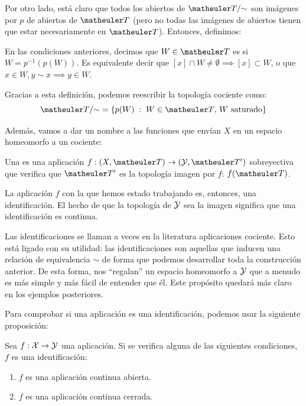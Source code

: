 Por otro lado, está claro que todos los abiertos de $\T/\mathord{\sim}$ son imágenes por $p$ de abiertos de $\T$ (pero no todas las imágenes de abiertos tienen que estar necesariamente en $\T$). Entonces, definimos:

\begin{defi}
	En las condiciones anteriores, decimos que $W\in\T$ es  si $W=p^{-1}(p(W))$. Es equivalente decir que $[x]\cap W\neq\emptyset\implies [x]\subset W$, o que $x\in W,y\sim x\implies y\in W$.
\end{defi}

Gracias a esta definición, podemos reescribir la topología cociente como:
\[\T/\mathord{\sim} = \{p(W)\midc W\in\T\text{, } W\text{ saturado}\}\]

Además, vamos a dar un nombre a las funciones que envían $X$ en un espacio homeomorfo a un cociente:

\begin{defi}[Identificación]
	Una  es una aplicación $f:(X,\T)\to (\mc{Y},\T')$ sobreyectiva que verifica que $\T'$ es la topología imagen por $f$: $f(\T)$.
\end{defi}

La aplicación $f$ con la que hemos estado trabajando es, entonces, una identificación. El hecho de que la topología de $\mathcal{Y}$ sea la imagen significa que una identificación es continua.

Las identificaciones se llaman a veces en la literatura aplicaciones cociente. Esto está ligado con su utilidad: las identificaciones son aquellas que inducen una relación de equivalencia $\sim$ de forma que podemos desarrollar toda la construcción anterior. De esta forma, nos ``regalan'' un espacio homeomorfo a $\mathcal{Y}$ que a menudo es más simple y más fácil de entender que él. Este propósito quedará más claro en los ejemplos posteriores.

Para comprobar si una aplicación es una identificación, podemos usar la siguiente proposición:

\begin{prop}
	Sea $f:\mathcal{X}\to\mathcal{Y}$ una aplicación. Si se verifica alguna de las siguientes condiciones, $f$ es una identificación:
	\begin{enumerate}
		\item $f$ es una aplicación continua abierta.
		\item $f$ es una aplicación continua cerrada.
	\end{enumerate}
\end{prop}

